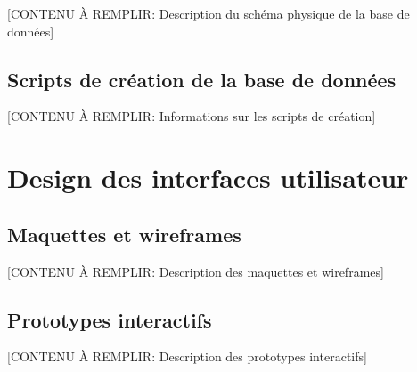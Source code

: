 [CONTENU À REMPLIR: Description du schéma physique de la base de données]


\subsection{Scripts de création de la base de données}

[CONTENU À REMPLIR: Informations sur les scripts de création]


\section{Design des interfaces utilisateur}


\subsection{Maquettes et wireframes}

[CONTENU À REMPLIR: Description des maquettes et wireframes]


\subsection{Prototypes interactifs}

[CONTENU À REMPLIR: Description des prototypes interactifs]

